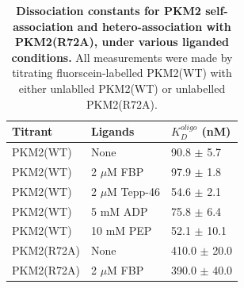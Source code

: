 %
%
\begin{table}[h]
\centering
\caption[Dissociation constants for PKM2 self-association and hetero-association with PKM2(R72A), under various liganded conditions.]{\textbf{Dissociation constants for PKM2 self-association and hetero-association with PKM2(R72A), under various liganded conditions.} All measurements were made by titrating fluorscein-labelled PKM2(WT) with either unlablled PKM2(WT) or unlabelled PKM2(R72A).}
\label{tab:oligo_kds}
\begin{tabular}{@{}lll@{}}
\toprule
Titrant        & Ligands          & $K_{D}^{oligo}$ (nM) \\ \midrule
PKM2(WT)   & None             & 90.8 $\pm$ 5.7            \\
PKM2(WT)   & 2 $\mu$M FBP     & 97.9 $\pm$ 1.8            \\
PKM2(WT)   & 2 $\mu$M Tepp-46 & 54.6 $\pm$ 2.1            \\
PKM2(WT)   & 5 mM ADP         & 75.8 $\pm$ 6.4            \\
PKM2(WT)   & 10 mM PEP        & 52.1 $\pm$ 10.1           \\
PKM2(R72A) & None             & 410.0 $\pm$ 20.0          \\
PKM2(R72A) & 2 $\mu$M FBP     & 390.0 $\pm$ 40.0          \\ \bottomrule
\end{tabular}
\end{table}
%
%
%
